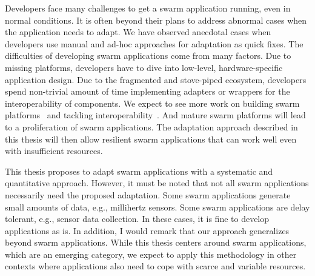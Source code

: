\documentclass[thesis.tex]{subfiles}
\begin{document}
Developers face many challenges to get a swarm application running, even in
normal conditions. It is often beyond their plans to address abnormal cases when
the application needs to adapt. We have observed anecdotal cases when developers
use manual and ad-hoc approaches for adaptation as quick fixes. The difficulties
of developing swarm applications come from many factors. Due to missing
platforms, developers have to dive into low-level, hardware-specific application
design. Due to the fragmented and stove-piped ecosystem, developers spend
non-trivial amount of time implementing adapters or wrappers for the
interoperability of components.  We expect to see more work on building swarm
platforms~\cite{mor2016toward, latronico2015vision} and tackling
interoperability~\cite{brooks2018component}. And mature swarm platforms will
lead to a proliferation of swarm applications. The adaptation approach described
in this thesis will then allow resilient swarm applications that can work well
even with insufficient resources.

This thesis proposes to adapt swarm applications with a systematic and
quantitative approach. However, it must be noted that not all swarm applications
necessarily need the proposed adaptation. Some swarm applications generate small
amounts of data, e.g., millihertz sensors. Some swarm applications are delay
tolerant, e.g., sensor data collection. In these cases, it is fine to develop
applications as is. In addition, I would remark that our approach generalizes
beyond swarm applications. While this thesis centers around swarm applications,
which are an emerging category, we expect to apply this methodology in other
contexts where applications also need to cope with scarce and variable
resources.
\end{document}

